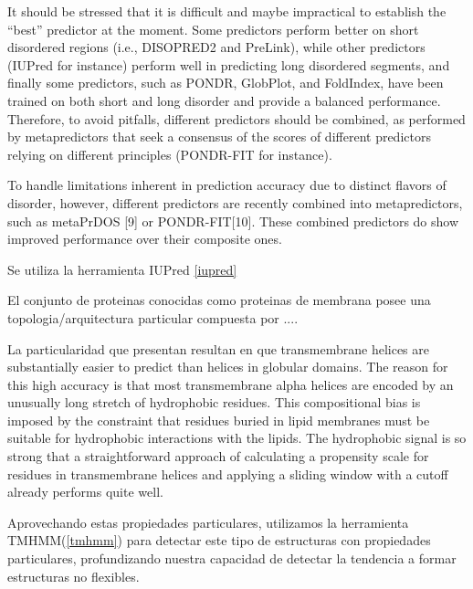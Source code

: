 It should be stressed that it is difficult and maybe impractical to establish the “best” predictor at the moment. Some predictors perform
better on short disordered regions (i.e., DISOPRED2 and PreLink), while other predictors (IUPred for instance) perform well in predicting long disordered segments, and finally some
predictors, such as PONDR, GlobPlot, and FoldIndex, have been trained on both short and long disorder and provide a balanced performance. 
Therefore, to avoid pitfalls, different predictors should be combined, as performed by metapredictors that seek a consensus of the scores of different predictors relying on different
principles (PONDR-FIT for instance).

To handle limitations inherent in prediction accuracy due to distinct flavors of disorder, however, different predictors are recently combined into metapredictors, such as metaPrDOS [9] or PONDR-FIT[10]. 
These combined predictors do show improved performance over their composite ones.

Se utiliza la herramienta IUPred \ref{iupred}



El conjunto de proteinas conocidas como proteinas de membrana posee una topologia/arquitectura particular compuesta por ....

La particularidad que presentan resultan en que transmembrane helices are substantially easier to predict than helices in globular domains.
The reason for this high accuracy is that most transmembrane alpha helices are encoded by an unusually long stretch of
hydrophobic residues. This compositional bias is imposed by the constraint that residues buried in lipid membranes
must be suitable for hydrophobic interactions with the lipids.
The hydrophobic signal is so strong that a straightforward approach of calculating a propensity scale for residues in
transmembrane helices and applying a sliding window with a cutoff already performs quite well.

Aprovechando estas propiedades particulares, utilizamos la herramienta TMHMM(\ref{tmhmm}) para detectar este tipo de estructuras con propiedades particulares, 
profundizando nuestra capacidad de detectar la tendencia a formar estructuras no flexibles.





